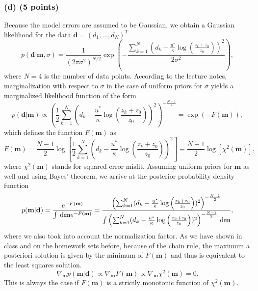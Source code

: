 \documentclass[11pt]{article}
\begin{document}
\subsubsection*{(d) (5 points)}

Because the model errors are assumed to be Gaussian, we obtain a Gaussian likelihood for the data $\mathbf{d} = (d_1, \hdots, d_N)^T$
\begin{equation}
p(\mathbf{d}|\mathbf{m}, \sigma)
= \frac{1}{(2\pi\sigma^2)^{N/2}} \exp\left( -\frac{\sum_{k=1}^N(d_k - \frac{u^*}{\kappa} \log \left( \frac{z_k+z_0}{z_0} \right))^2}{2\sigma^2} \right),
\end{equation}
where $N = 4$ is the number of data points. 
According to the lecture notes, marginalization with respect to $\sigma$ in the case of uniform priors for $\sigma$ yields a marginalized likelihood function of the form
\begin{equation}
p(\mathbf{d}|\mathbf{m}) \propto \left(\frac{1}{2}\sum_{k=1}^N(d_k - \frac{u^*}{\kappa} \log \left( \frac{z_k+z_0}{z_0} \right))^2\right)^{-\frac{N-1}{2}} = \exp(-F(\mathbf{m})),
\end{equation}
which defines the function $F(\mathbf{m})$ as
\begin{equation}
F(\mathbf{m}) = \frac{N-1}{2}\log \left[\frac{1}{2}\sum_{k=1}^N\left(d_k - \frac{u^*}{\kappa} \log \left( \frac{z_k+z_0}{z_0} \right)\right)^2\right] \equiv \frac{N-1}{2}\log\left[\chi^2(\mathbf{m})\right], 
\end{equation}
where $\chi^2(\mathbf{m})$ stands for squared error misfit.
Assuming uniform priors for $\mathbf{m}$ as well and using Bayes' theorem, we arrive at the posterior probability density function
\begin{equation}
p(\mathbf{m}|\mathbf{d}) = \frac{e^{-F(\mathbf{m})}}{\int \, \text{d}\mathbf{m} e^{-F(\mathbf{m})}} = \frac{\left(\sum_{k=1}^N(d_k - \frac{u^*}{\kappa} \log \left( \frac{z_k+z_0}{z_0} \right))^2\right)^{-\frac{N-1}{2}}}{\int \left(\sum_{k=1}^N(d_k - \frac{u^*}{\kappa} \log \left( \frac{z_k+z_0}{z_0} \right))^2\right)^{-\frac{N-1}{2}} \, \text{d}\mathbf{m}}, 
\end{equation}
where we also took into account the normalization factor.
As we have shown in class and on the homework sets before, because of the chain rule, the maximum a posteriori solution is given by the minimum of $F(\mathbf{m})$ and thus is equivalent to the least squares solution.
\begin{equation}
\nabla_\mathbf{m} p(\mathbf{m}|\mathbf{d}) \propto \nabla_\mathbf{m} F(\mathbf{m}) \propto \nabla_\mathbf{m} \chi^2(\mathbf{m})= 0.
\end{equation}
This is always the case if $F(\mathbf{m})$ is a strictly monotonic function of $\chi^2(\mathbf{m})$.
\end{document}
